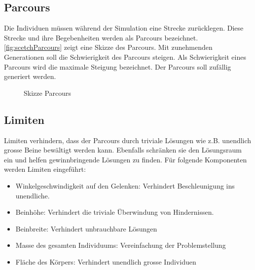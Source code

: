     \subsection{Parcours\label{subsub:parcours}}

      Die Individuen müssen während der Simulation eine Strecke zurücklegen.
      Diese Strecke und ihre Begebenheiten werden als Parcours bezeichnet.
      \vref{fig:scetchParcours} zeigt eine Skizze des Parcours.
      Mit zunehmenden Generationen soll die Schwierigkeit des Parcours steigen.
      Als Schwierigkeit eines Parcours wird die maximale Steigung bezeichnet.
      Der Parcours soll zufällig generiert werden.

      \begin{figure}[H]
        
        \caption{Skizze Parcours\label{fig:scetchParcours}}
      \end{figure}

    \subsection{Limiten\label{sub:IntroReqLimit}}

      Limiten verhindern, dass der Parcours durch triviale Lösungen wie z.B. unendlich grosse Beine bewältigt werden kann.
      Ebenfalls schränken sie den Lösungsraum ein und helfen gewinnbringende Lösungen zu finden.
      Für folgende Komponenten werden Limiten eingeführt:
      \begin{itemize}
        \item Winkelgeschwindigkeit auf den Gelenken: Verhindert Beschleunigung ins unendliche.
        \item Beinhöhe: Verhindert die triviale Überwindung von Hindernissen.
        \item Beinbreite: Verhindert unbrauchbare Lösungen
        \item Masse des gesamten Individuums: Vereinfachung der Problemstellung
        \item Fläche des Körpers: Verhindert unendlich grosse Individuen
      \end{itemize}

